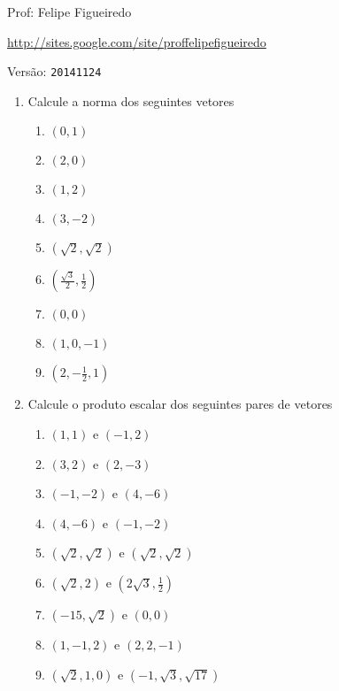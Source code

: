 \documentclass[a4paper]{article}
\begin{document}
\parbox[c]{.825\textwidth}{\raggedright%
{Prof: Felipe Figueiredo\par}
{\url{http://sites.google.com/site/proffelipefigueiredo}\par}
}

Versão: \verb|20141124|




\begin{enumerate}
\item Calcule a norma dos seguintes vetores
  \begin{enumerate}
  \item $(0,1)$
  \item $(2,0)$
  \item $(1,2)$
  \item $(3,-2)$
  \item $(\sqrt{2},\sqrt{2})$
  \item $(\frac{\sqrt{3}}{2},\frac{1}{2})$
  \item $(0,0)$
  \item $(1,0,-1)$
  \item $(2,-\frac{1}{2},1)$
  \end{enumerate}
  
\item Calcule o produto escalar dos seguintes pares de vetores

  \begin{enumerate}
  \item $(1,1)$ e $(-1,2)$
  \item $(3,2)$ e $(2,-3)$
  \item $(-1,-2)$ e $(4,-6)$
  \item $(4,-6)$ e $(-1,-2)$
  \item $(\sqrt{2},\sqrt{2})$ e $(\sqrt{2},\sqrt{2})$
  \item $(\sqrt{2},2)$ e $(2\sqrt{3},\frac{1}{2})$
  \item $(-15,\sqrt{2})$ e $(0,0)$
  \item $(1,-1,2)$ e $(2,2,-1)$
  \item $(\sqrt{2},1,0)$ e $(-1,\sqrt{3},\sqrt{17})$

  \end{enumerate}


\end{enumerate}
\end{document}
